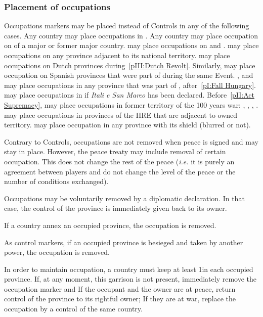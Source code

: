 \subsubsection{Placement of occupations}
\aparag Occupations markers may be placed instead of Controls in any
of the following cases.
\bparag Any country may place occupations in \continentCaraibes.
\bparag[] [TBD] Any country may place occupation on \TP of a major or
former major country.
\bparag \POR may place occupations on \paysOman and \paysAden.
\bparag \RUS may place occupations on any province adjacent to its
national territory.
\bparag \HIS may place occupations on Dutch provinces
during~\ref{pIII:Dutch Revolt}. Similarly, \HOL may place occupation
on Spanish provinces that were part of \paysBourgogne during the same
Event.
\bparag \TUR, \AUS and \POL may place occupations in any province that
was part of \paysHongrie, after~\ref{pI:Fall Hungary}.
\bparag[] [TBD] \VEN may place occupations in \regionItalie if
\emph{Itali e San Marco} has been declared.
\bparag[] [TBD] Before~\ref{pII:Act Supremacy}, \ANG may place
occupations in former territory of the 100 years war:
\provinceGuyenne, \provinceQuercy, \provincePoitou, \provincePicardie.
\bparag \FRA may place occupations in provinces of the HRE that are
adjacent to owned territory.
\bparag \paysSavoie may place occupation in any province with its
shield (blurred or not).

\aparag Contrary to Controls, occupations are not removed when peace
is signed and may stay in place.
\bparag However, the peace treaty may include removal of certain
occupation. This does not change the rest of the peace (\emph{i.e.} it
is purely an agreement between players and do not change the level of
the peace or the number of conditions exchanged).

\aparag Occupations may be voluntarily removed by a diplomatic
declaration. In that case, the control of the province is immediately
given back to its owner.

\aparag If a country annex an occupied province, the occupation is
removed.

\aparag As control markers, if an occupied province is besieged and
taken by another power, the occupation is removed.

\aparag In order to maintain occupation, a country must keep at least
1\LD in each occupied province. If, at any moment, this garrison is
not present, immediately remove the occupation marker and
\bparag If the occupant and the owner are at peace, return
control of the province to its rightful owner;
\bparag If they are at war, replace the occupation by a control of the
same country.

